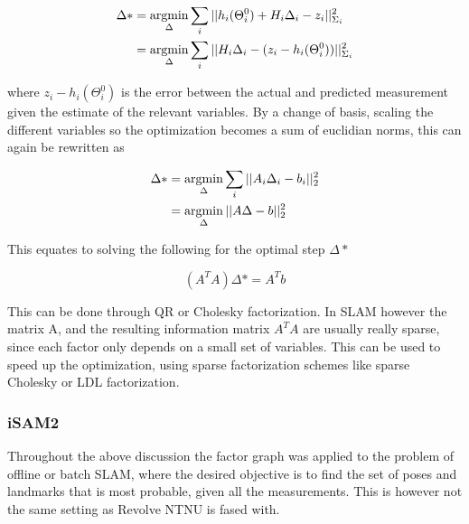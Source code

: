 \begin{align}
    \Delta* &= \operatorname*{argmin}_{\Delta}\sum_i ||h_i(\Theta_i^0) + H_i\Delta_i - z_i||_{\Sigma_i}^2 \\ 
    &= \operatorname*{argmin}_{\Delta}\sum_i || H_i\Delta_i - (z_i - h_i(\Theta_i^0))||_{\Sigma_i}^2
\end{align}

where $z_i - h_i(\Theta_i^0)$ is the error between the actual and predicted measurement given the estimate of the relevant variables. By a change of basis, scaling the different variables so the optimization becomes a sum of euclidian norms, this can again be rewritten as 

\begin{align}
    \Delta* &= \operatorname*{argmin}_{\Delta}\sum_i||A_i\Delta_i - b_i||_2^2 \\
    &= \operatorname*{argmin}_{\Delta}||A\Delta - b||_2^2
\end{align}

This equates to solving the following for the optimal step $\Delta*$

\begin{equation}
    (A^TA)\Delta* = A^Tb
\end{equation}

This can be done through QR or Cholesky factorization. In SLAM however the matrix A, and the resulting information matrix $A^TA$ are usually really sparse, since each factor only depends on a small set of variables. This can be used to speed up the optimization, using sparse factorization schemes like sparse Cholesky or LDL factorization\cite{SparseLinearAlgebra}. 

\subsubsection{iSAM2}

Throughout the above discussion the factor graph was applied to the problem of offline or batch SLAM, where the desired objective is to find the set of poses and landmarks that is most probable, given all the measurements. This is however not the same setting as Revolve NTNU is fased with.